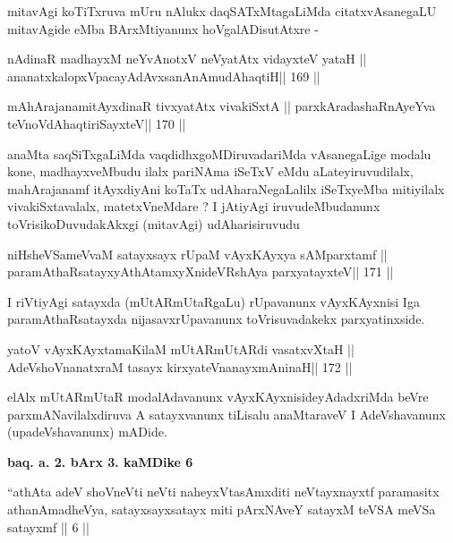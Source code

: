 \begin{artha}
mitavAgi koTiTxruva mUru nAlukx daqSATxMtagaLiMda citatxvAsanegaLU
mitavAgide eMba BArxMtiyanunx hoVgalADisutAtxre -
\end{artha}

\begin{shl}
nA\s\s dinaR madhayxM neYvAnotxV neVyatAtx vidayxteV yataH ||
ananatxkalopxVpacayAdAvxsanAnAmudAhaqtiH\hfill || 169 ||
\end{shl}

\begin{shl}
mAhArajanamitAyxdinaR tivxyatAtx vivakiSxtA ||
parxkAradashaRnAyeYva teVnoVdAhaqtiriSayxteV\hfill || 170 ||
\end{shl}

\begin{artha}
anaMta saqSiTxgaLiMda vaqdidhxgoMDiruvadariMda vAsanegaLige modalu
kone, madhayxveMbudu ilalx pariNAma iSeTxV eMdu aLateyiruvudilalx,
mahArajanamf itAyxdiyAni koTaTx udAharaNegaLalilx iSeTxyeMba
mitiyilalx vivakiSxtavalalx, matetxVneMdare ? I jAtiyAgi
iruvudeMbudanunx toVrisikoDuvudakAkxgi (mitavAgi) udAharisiruvudu
\end{artha}

\begin{shl}
niHsheVSameVvaM satayxsayx rUpaM vAyxKAyxya sAMparxtamf ||
paramAthaRsatayxyAthAtamxyXnideVRshAya parxyatayxteV\hfill || 171 ||
\end{shl}

\begin{artha}
I riVtiyAgi satayxda (mUtARmUtaRgaLu) rUpavanunx vAyxKAyxnisi Iga
paramAthaRsatayxda nijasavxrUpavanunx toVrisuvadakekx parxyatinxside.
\end{artha}

\begin{shl}
yatoV vAyxKAyxtamaKilaM mUtARmUtARdi vasatxvXtaH ||
AdeVshoV\s nanatxraM tasayx kirxyateV\s nanayxmAninaH\hfill || 172 ||
\end{shl}

\begin{artha}
elAlx mUtARmUtaR modalAdavanunx vAyxKAyxnisideyAdadxriMda beVre
parxmANavilalxdiruva A satayxvanunx tiLisalu anaMtaraveV I
AdeVshavanunx (upadeVshavanunx) mADide.
\end{artha}

\begin{center}
\textbf{baq. a. 2. bArx 3. kaMDike 6}
\end{center}

\begin{artha}
``athAta adeV shoVneVti neVti naheyxVtasAmxditi neVtayxnayxtf
  paramasitx athanAmadheVya, satayxsayxsatayx miti pArxNAveY satayxM
  teVSA meVSa satayxmf || 6 ||
\end{artha}

